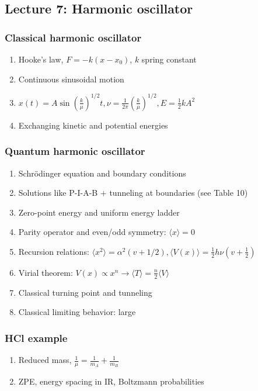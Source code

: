\documentclass[11pt]{article}
\begin{document}
\subsection{Lecture 7: Harmonic oscillator}
\label{sec:org46d3c9e}
\subsubsection{Classical harmonic oscillator}
\label{sec:org3656863}
\begin{enumerate}
\item Hooke's law, \(F=-k(x-x_0)\), \(k\) spring constant
\item Continuous sinusoidal motion
\item \(x(t)=A \sin(\frac{k}{\mu})^{1/2}t, \nu=\frac{1}{2\pi}(\frac{k}{\mu})^{1/2}, E=\frac{1}{2}kA^2\)
\item Exchanging kinetic and potential energies
\end{enumerate}
\subsubsection{Quantum harmonic oscillator}
\label{sec:orgd351400}
\begin{enumerate}
\item Schr\"{o}dinger equation and boundary conditions
\item Solutions like P-I-A-B + tunneling at boundaries (see Table 10)
\item Zero-point energy and uniform energy ladder
\item Parity operator and even/odd symmetry:  \(\langle x \rangle =0\)
\item Recursion relations: \(\langle x^2 \rangle =
      \alpha^2 (v+1/2), \langle V(x) \rangle = \frac{1}{2} h\nu (v+\frac{1}{2})\)
\item Virial theorem: \(V(x) \propto x^n \rightarrow \langle T \rangle = \frac{n}{2}\langle V \rangle\)
\item Classical turning point and tunneling
\item Classical limiting behavior: large
\end{enumerate}
\subsubsection{HCl example}
\label{sec:org16a005f}
\begin{enumerate}
\item Reduced mass, \(\frac{1}{\mu}=\frac{1}{m_A}+\frac{1}{m_B}\)
\item ZPE, energy spacing in IR, Boltzmann probabilities
\end{enumerate}
\end{document}
